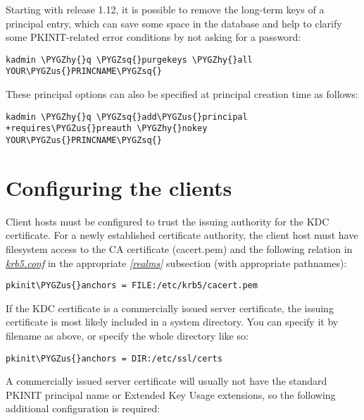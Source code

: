 \documentclass[letterpaper,10pt,english]{sphinxmanual}
\def\PYGZus{\char`\_}
\def\PYGZhy{\char`\-}
\def\PYGZsq{\char`\'}
\begin{document}
Starting with release 1.12, it is possible to remove the long-term
keys of a principal entry, which can save some space in the database
and help to clarify some PKINIT-related error conditions by not asking
for a password:

\begin{Verbatim}[commandchars=\\\{\}]
kadmin \PYGZhy{}q \PYGZsq{}purgekeys \PYGZhy{}all YOUR\PYGZus{}PRINCNAME\PYGZsq{}
\end{Verbatim}

These principal options can also be specified at principal creation
time as follows:

\begin{Verbatim}[commandchars=\\\{\}]
kadmin \PYGZhy{}q \PYGZsq{}add\PYGZus{}principal +requires\PYGZus{}preauth \PYGZhy{}nokey YOUR\PYGZus{}PRINCNAME\PYGZsq{}
\end{Verbatim}


\section{Configuring the clients}
\label{admin/pkinit:configuring-the-clients}
Client hosts must be configured to trust the issuing authority for the
KDC certificate.  For a newly established certificate authority, the
client host must have filesystem access to the CA certificate
(cacert.pem) and the following relation in {\hyperref[admin/conf_files/krb5_conf:krb5-conf-5]{\emph{krb5.conf}}} in the
appropriate {\hyperref[admin/conf_files/krb5_conf:realms]{\emph{{[}realms{]}}}} subsection (with appropriate pathnames):

\begin{Verbatim}[commandchars=\\\{\}]
pkinit\PYGZus{}anchors = FILE:/etc/krb5/cacert.pem
\end{Verbatim}

If the KDC certificate is a commercially issued server certificate,
the issuing certificate is most likely included in a system directory.
You can specify it by filename as above, or specify the whole
directory like so:

\begin{Verbatim}[commandchars=\\\{\}]
pkinit\PYGZus{}anchors = DIR:/etc/ssl/certs
\end{Verbatim}

A commercially issued server certificate will usually not have the
standard PKINIT principal name or Extended Key Usage extensions, so
the following additional configuration is required:
\end{document}
